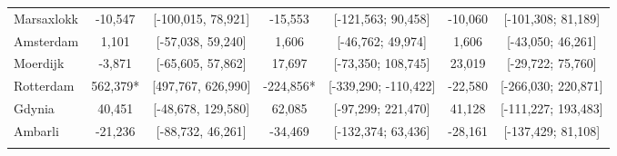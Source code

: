 \begin{table}[ht]
\begin{adjustbox}{max width=\textwidth}
\begin{tabular}{lcccccc}
  Marsaxlokk & -10,547 & [-100,015, 78,921] &  -15,553 & [-121,563; 90,458] & -10,060 & [-101,308; 81,189] \\ 
  Amsterdam &   1,101 & [-57,038, 59,240] &    1,606 & [-46,762; 49,974] &   1,606 & [-43,050; 46,261] \\ 
  Moerdijk &  -3,871 & [-65,605, 57,862] &   17,697 & [-73,350; 108,745] &  23,019 & [-29,722; 75,760] \\ 
  Rotterdam & 562,379* & [497,767, 626,990] & -224,856* & [-339,290; -110,422] & -22,580 & [-266,030; 220,871] \\ 
  Gdynia &  40,451 & [-48,678, 129,580] &   62,085 & [-97,299; 221,470] &  41,128 & [-111,227; 193,483] \\ 
  Ambarli & -21,236 & [-88,732, 46,261] &  -34,469 & [-132,374; 63,436] & -28,161 & [-137,429; 81,108] \\ 
   [2ex] \hline \hline {}\end{tabular} 
 \end{adjustbox}
\endgroup
\end{table}
